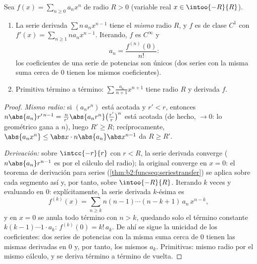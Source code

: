 \begin{theorem}\label{thm:b2:powerseries:calculus}
Sea $f(x) = \sum_{n\geq0} a_n x^n$ de radio $R > 0$ (variable real
$x \in \intoo{-R}{R}$).
\begin{enumerate}
  \item La serie derivada $\sum n\,a_n x^{n-1}$ tiene el
        \emph{mismo} radio $R$, y $f$ es de clase $C^1$ con $f'(x) =
        \sum_{n \geq 1} n a_n x^{n-1}$. Iterando, $f$ es $C^\infty$
        y
        \[
        a_n = \frac{f^{(n)}(0)}{n!} :
        \]
        los coeficientes de una serie de potencias son únicos (dos
        series con la misma suma cerca de $0$ tienen los mismos
        coeficientes).
  \item Primitiva término a término: $\sum \frac{a_n}{n+1}x^{n+1}$
        tiene radio $R$ y derivada $f$.
\end{enumerate}
\end{theorem}

\begin{proof}
\emph{Mismo radio:} si $(a_nr^n)$ está acotada y $r' < r$, entonces
$n\abs{a_n} r'^{\,n-1} = \frac{n}{r'}\abs{a_nr^n}
\bigl(\frac{r'}{r}\bigr)^n$ está acotada (de hecho, $\to 0$: lo
geométrico gana a $n$), luego $R' \geq R$; recíprocamente, $\abs{a_n
x^n} \leq \abs x \cdot n\abs{a_n}\abs x^{n-1}$ da $R \geq R'$.

\emph{Derivación:} sobre $\intcc{-r}{r}$ con $r < R$, la serie
derivada converge  ($n\abs{a_n}r^{n-1}$ es  por
el cálculo del radio); la original converge en $x = 0$: el teorema
de derivación para series
(\cref{thm:b2:funcseq:seriestransfer}) se aplica sobre cada segmento
así y, por tanto, sobre $\intoo{-R}{R}$. Iterando $k$ veces y
evaluando en $0$: explícitamente, la serie derivada $k$-ésima es
\[
f^{(k)}(x) = \sum_{n\geq k} n(n-1)\cdots(n-k+1)\,a_n\,x^{n-k},
\]
y en $x = 0$ se anula todo término con $n > k$, quedando solo el
término constante $k(k-1)\cdots1\cdot a_k$: $f^{(k)}(0) =
k!\,a_k$. De ahí se sigue la unicidad de los coeficientes: dos
series de potencias con la misma suma cerca de $0$ tienen las mismas
derivadas en $0$ y, por tanto, los mismos $a_k$. Primitivas: mismo
radio por el mismo cálculo, y se deriva término a término de
vuelta.
\end{proof}

